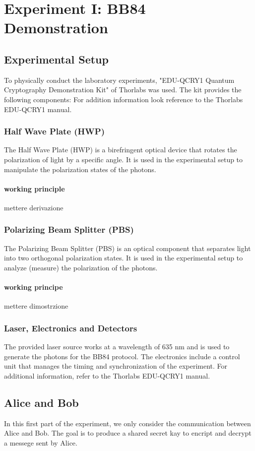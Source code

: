 \documentclass[10pt,letterpaper]{report}
\begin{document}
\chapter {Experiment I: BB84 Demonstration}

\section{Experimental Setup}


To physically conduct the laboratory experiments, "EDU-QCRY1 Quantum Cryptography Demonstration Kit" of Thorlabs was used. The kit provides the following components:
For addition information look reference to the Thorlabs EDU-QCRY1 manual.


\subsection{Half Wave Plate (HWP)}
The Half Wave Plate (HWP) is a birefringent optical device that rotates the polarization of light by a specific angle. It is used in the experimental setup to manipulate the polarization states of the photons.

\subsubsection{working principle} 
mettere derivazione

\subsection{Polarizing Beam Splitter (PBS)}
The Polarizing Beam Splitter (PBS) is an optical component that separates light into two orthogonal polarization states. It is used in the experimental setup to analyze (measure) the polarization of the photons.
\subsubsection{working principe}
mettere dimostrzione 

\subsection{Laser, Electronics and Detectors}
The provided laser source works at a wavelength of 635 nm and is used to generate the photons for the BB84 protocol. The electronics include a control unit that manages the timing and synchronization of the experiment. For additional information, refer to the Thorlabs EDU-QCRY1 manual.


\section{Alice and Bob}

In this first part of the experiment, we only consider the communication between Alice and Bob. The goal is to produce a shared secret kay to encript and decrypt a messege sent by Alice.
\end{document}
